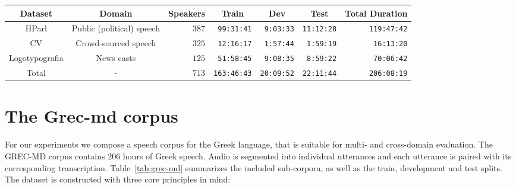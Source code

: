 \documentclass[journal]{IEEEtran}
\begin{document}
\begin{table*}[!t]
\caption{\label{tab:grec-md}The GREC-MD corpus. We can see the duration of each split in \texttt{hours:minutes:seconds} format, as well as the number of speakers for each of the sub-corpora.}
\centering
\begin{tabular}{ccrrrrr}
\hline
\textbf{Dataset} & \textbf{Domain}  & \multicolumn{1}{c}{\textbf{Speakers}} &  \multicolumn{1}{c}{\textbf{Train}} & \multicolumn{1}{c}{\textbf{Dev}} & \multicolumn{1}{c}{\textbf{Test}}  & \multicolumn{1}{c}{\textbf{Total Duration}} \\ \hline
HParl & Public (political) speech & $387$ & \texttt{99:31:41} & \texttt{9:03:33} & \texttt{11:12:28} & \texttt{119:47:42} \\
CV & Crowd-sourced speech & $325$ & \texttt{12:16:17} & \texttt{1:57:44} & \texttt{1:59:19} & \texttt{16:13:20} \\
Logotypografia & News casts & $125$ & \texttt{51:58:45} & \texttt{9:08:35} & \texttt{8:59:22} & \texttt{70:06:42} \\
Total & - & $713$ & \texttt{163:46:43} & \texttt{20:09:52} & \texttt{22:11:44} & \texttt{206:08:19} \\ \hline
\end{tabular}
\end{table*}
\section{The Grec-md corpus}
\label{sec:grec-md-corpus}

For our experiments we compose a speech corpus for the Greek language, that is suitable for multi- and cross-domain evaluation. The GREC-MD corpus contains $206$ hours of Greek speech. Audio is segmented into individual utterances and each utterance is paired with its corresponding transcription. Table~\ref{tab:grec-md} summarizes the included sub-corpora, as well as the train, development and test splits.
The dataset is constructed with three core principles in mind:
\end{document}
